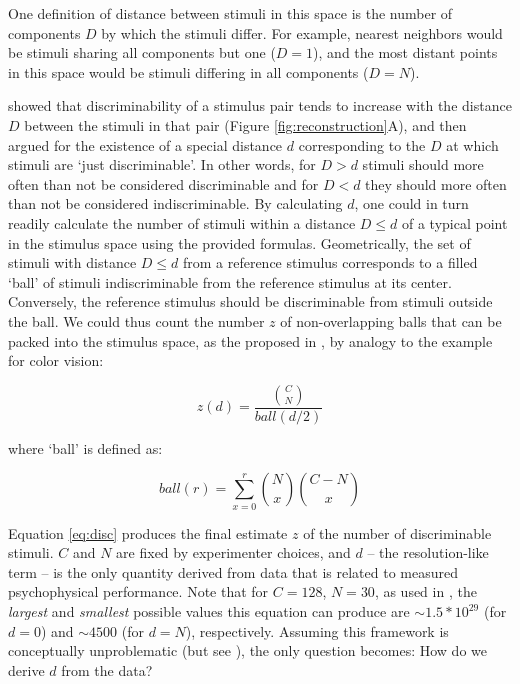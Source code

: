 \documentclass[letterpaper,twocolumn,10pt]{article}
\begin{document}
One definition of distance between stimuli in this space is the number of components $D$ by which the stimuli differ. 
For example, nearest neighbors would be stimuli sharing all components but one ($D=1$), 
and the most distant points in this space would be stimuli differing in all components ($D=N$). 

\cite{bushdid_humans_2014} showed that discriminability of a stimulus pair tends to increase with the distance $D$ between the stimuli in that pair (Figure \ref{fig:reconstruction}A), 
and then argued for the existence of a special distance $d$ corresponding to the $D$ at which stimuli are `just discriminable'.  
In other words, for $D>d$ stimuli should more often than not be considered discriminable 
and for $D<d$ they should more often than not be considered indiscriminable.  
By calculating $d$, one could in turn readily calculate the number of stimuli within a distance $D \leq d$ of a typical point in the stimulus space using the provided formulas. 
Geometrically, the set of stimuli with distance $D \leq d$ from a reference stimulus corresponds to a filled `ball' of stimuli indiscriminable from the reference stimulus at its center.  
Conversely, the reference stimulus should be discriminable from stimuli outside the ball.  
We could thus count the number $z$ of non-overlapping balls that can be packed into the stimulus space, 
as the proposed in \cite{bushdid_humans_2014}, by analogy to the example for color vision: 

\begin{equation}
\label{eq:disc}
z(d) = \frac{\binom{C}{N}}{ball(d/2)}  
\end{equation}

where `ball' is defined as: 

\begin{equation}
\label{eq:ball}
ball(r) = \sum_{x=0}^{r} \binom{N}{x}\binom{C-N}{x}
\end{equation} 

Equation \ref{eq:disc} produces the final estimate $z$ of the number of discriminable stimuli. 
$C$ and $N$ are fixed by experimenter choices, 
and $d$ -- the resolution-like term -- is the only quantity derived from data that is related to measured psychophysical performance. 
Note that for $C=128$, $N=30$, as used in \cite{bushdid_humans_2014}, the \textit{largest} and \textit{smallest} possible values this equation can produce are $\sim 1.5 * 10^{29}$ (for $d=0$) and $\sim 4500$ (for $d=N$), respectively.  
Assuming this framework is conceptually unproblematic (but see \cite{meister_can_2014}), 
the only question becomes: How do we derive $d$ from the data? 
\end{document}
